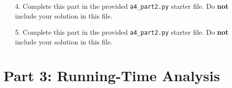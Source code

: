 \documentclass[fontsize=11pt]{article}
\begin{document}
\begin{enumerate}
\begin{enumerate}
\begin{proof}
Therefore at the end of the iteration, for all natural numbers $k$ in between 0 and \texttt{len(nums\_so\_far[$i$])} inclusive, if k is coprime to 2 and coprime to 3, then $k$ in \texttt{len(nums\_so\_far)}.
\end{proof}
\end{enumerate}

\item[4.]
Complete this part in the provided \texttt{a4\_part2.py} starter file.
Do \textbf{not} include your solution in this file.

\item[5.]
Complete this part in the provided \texttt{a4\_part2.py} starter file.
Do \textbf{not} include your solution in this file.
\end{enumerate}

\newpage

\section*{Part 3: Running-Time Analysis}
\end{document}

